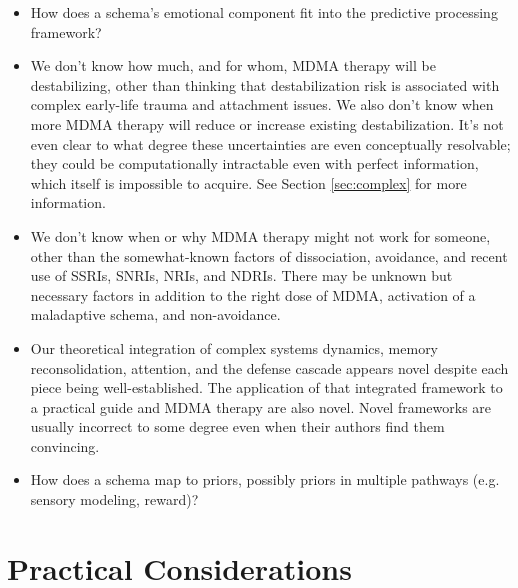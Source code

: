 \documentclass[12pt,letterpaper]{book}
\begin{document}
\begin{itemize}
    In our experience, MDMA therapy seems to produce, in the long-term, changes that both the individual and their emotionally-healthy friends and therapists think are positive developments\footnote{High-control communities and abusers may be unhappy about someone's increase in independence. Likewise, communities who form an identity around their fear, hatred, or subjugation of an out-group may be unhappy about someone's increased compassion for the out-group.}. In this book we use the terms "maladaptive" and "adaptive" casually in this sense.
    \item How does a schema's emotional component fit into the predictive processing framework?
    \item We don't know how much, and for whom, MDMA therapy will be destabilizing, other than thinking that destabilization risk is associated with complex early-life trauma and attachment issues. We also don't know when more MDMA therapy will reduce or increase existing destabilization. It's not even clear to what degree these uncertainties are even conceptually resolvable; they could be computationally intractable even with perfect information, which itself is impossible to acquire. See Section \ref{sec:complex} for more information.
    \item We don't know when or why MDMA therapy might not work for someone, other than the somewhat-known factors of dissociation, avoidance, and recent use of SSRIs, SNRIs, NRIs, and NDRIs. There may be unknown but necessary factors in addition to the right dose of MDMA, activation of a maladaptive schema, and non-avoidance.
    \item Our theoretical integration of complex systems dynamics, memory reconsolidation, attention, and the defense cascade appears novel despite each piece being well-established. The application of that integrated framework to a practical guide and MDMA therapy are also novel. Novel frameworks are usually incorrect to some degree even when their authors find them convincing.
    \item How does a schema map to priors, possibly priors in multiple pathways (e.g. sensory modeling, reward)?
\end{itemize}
\chapter{Practical Considerations}
\end{document}
